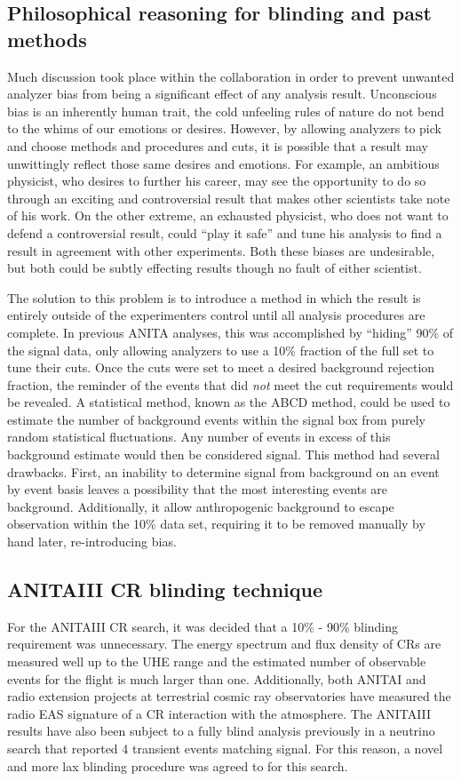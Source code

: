 	\subsection{Philosophical reasoning for blinding and past methods}
		Much discussion took place within the collaboration in order to prevent unwanted analyzer bias from being a significant effect of any analysis result.  Unconscious bias is an inherently human trait, the cold unfeeling rules of nature do not bend to the whims of our emotions or desires.  However, by allowing analyzers to pick and choose methods and procedures and cuts, it is possible that a result may unwittingly reflect those same desires and emotions.  For example, an ambitious physicist, who desires to further his career, may see the opportunity to do so through an exciting and controversial result that makes other scientists take note of his work.  On the other extreme, an exhausted physicist, who does not want to defend a controversial result, could ``play it safe'' and tune his analysis to find a result in agreement with other experiments.  Both these biases are undesirable, but both could be subtly effecting results though no fault of either scientist.
		
		The solution to this problem is to introduce a method in which the result is entirely outside of the experimenters control until all analysis procedures are complete.  In previous ANITA analyses, this was accomplished by ``hiding'' 90\% of the signal data, only allowing analyzers to use a 10\% fraction of the full set to tune their cuts.  Once the cuts were set to meet a desired background rejection fraction, the reminder of the events that did \textit{not} meet the cut requirements would be revealed.  A statistical method, known as the ABCD method, could be used to estimate the number of background events within the signal box from purely random statistical fluctuations.  Any number of events in excess of this background estimate would then be considered signal.  This method had several drawbacks. First, an inability to determine signal from background on an event by event basis leaves a possibility that the most interesting events are background.  Additionally, it allow anthropogenic background to escape observation within the 10\% data set, requiring it to be removed manually by hand later, re-introducing bias.
		
	\subsection{ANITAIII CR blinding technique}
		For the ANITAIII CR search, it was decided that a 10\% - 90\% blinding requirement was unnecessary.  The energy spectrum and flux density of CRs are measured well up to the UHE range and the estimated number of observable events for the flight is much larger than one.  Additionally, both ANITAI and radio extension projects at terrestrial cosmic ray observatories have measured the radio EAS signature of a CR interaction with the atmosphere.  The ANITAIII results have also been subject to a fully blind analysis previously in a neutrino search that reported 4 transient events matching signal.  For this reason, a novel and more lax blinding procedure was agreed to for this search.

